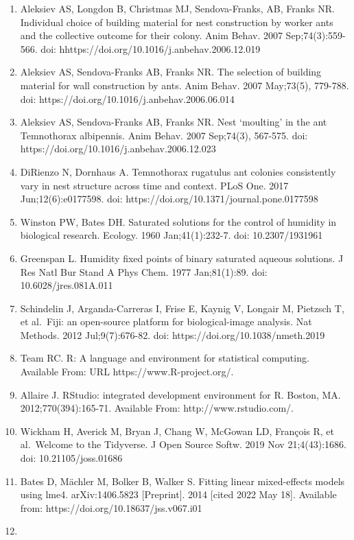 \documentclass[3p]{elsarticle} %
\begin{document}
\begin{enumerate}
\item
  Aleksiev AS, Longdon B, Christmas MJ, Sendova-Franks, AB, Franks NR.
  Individual choice of building material for nest construction by worker
  ants and the collective outcome for their colony. Anim Behav. 2007
  Sep;74(3):559-566. doi: hhttps://doi.org/10.1016/j.anbehav.2006.12.019
\item
  Aleksiev AS, Sendova-Franks AB, Franks NR. The selection of building
  material for wall construction by ants. Anim Behav. 2007 May;73(5),
  779-788. doi: https://doi.org/10.1016/j.anbehav.2006.06.014
\item
  Aleksiev AS, Sendova-Franks AB, Franks NR. Nest `moulting' in the ant
  Temnothorax albipennis. Anim Behav. 2007 Sep;74(3), 567-575. doi:
  https://doi.org/10.1016/j.anbehav.2006.12.023
\item
  DiRienzo N, Dornhaus A. Temnothorax rugatulus ant colonies
  consistently vary in nest structure across time and context. PLoS One.
  2017 Jun;12(6):e0177598. doi:
  https://doi.org/10.1371/journal.pone.0177598
\item
  Winston PW, Bates DH. Saturated solutions for the control of humidity
  in biological research. Ecology. 1960 Jan;41(1):232-7. doi:
  10.2307/1931961
\item
  Greenspan L. Humidity fixed points of binary saturated aqueous
  solutions. J Res Natl Bur Stand A Phys Chem. 1977 Jan;81(1):89. doi:
  10.6028/jres.081A.011
\item
  Schindelin J, Arganda-Carreras I, Frise E, Kaynig V, Longair M,
  Pietzsch T, et al.~Fiji: an open-source platform for biological-image
  analysis. Nat Methods. 2012 Jul;9(7):676-82. doi:
  https://doi.org/10.1038/nmeth.2019
\item
  Team RC. R: A language and environment for statistical computing.
  Available From: URL https://www.R-project.org/.
\item
  Allaire J. RStudio: integrated development environment for R. Boston,
  MA. 2012;770(394):165-71. Available From: http://www.rstudio.com/.
\item
  Wickham H, Averick M, Bryan J, Chang W, McGowan LD, François R, et
  al.~Welcome to the Tidyverse. J Open Source Softw. 2019 Nov
  21;4(43):1686. doi: 10.21105/joss.01686
\item
  Bates D, Mächler M, Bolker B, Walker S. Fitting linear mixed-effects
  models using lme4. arXiv:1406.5823 {[}Preprint{]}. 2014 {[}cited 2022
  May 18{]}. Available from: https://doi.org/10.18637/jss.v067.i01
\item

\end{enumerate}
\end{document}
